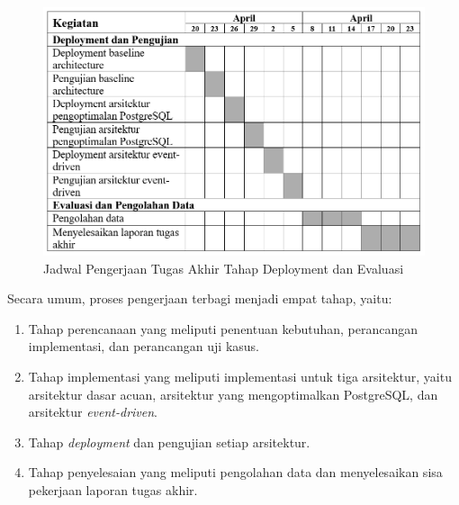 \begin{figure}[htbp]
    \centering
    \includegraphics[width=1\textwidth]{resources/schedule/jadwal-3.png}
    \caption{Jadwal Pengerjaan Tugas Akhir Tahap Deployment dan Evaluasi}
    \label{fig:jadwal pelaksanaan deployment}
\end{figure}

Secara umum, proses pengerjaan terbagi menjadi empat tahap, yaitu:

\begin{enumerate}
    \item Tahap perencanaan yang meliputi penentuan kebutuhan, perancangan implementasi, dan perancangan uji kasus.
    \item Tahap implementasi yang meliputi implementasi untuk tiga arsitektur, yaitu arsitektur dasar acuan, arsitektur yang mengoptimalkan PostgreSQL, dan arsitektur \textit{event-driven}.
    \item Tahap \textit{deployment} dan pengujian setiap arsitektur.
    \item Tahap penyelesaian yang meliputi pengolahan data dan menyelesaikan sisa pekerjaan laporan tugas akhir.
\end{enumerate}